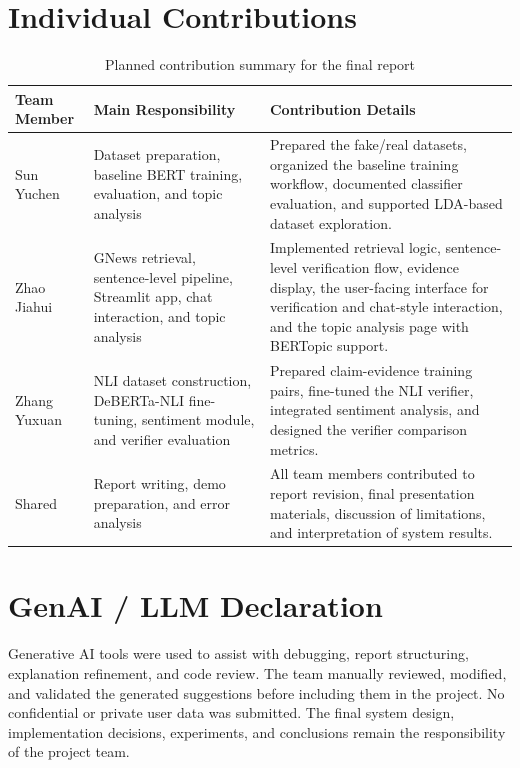 \documentclass[11pt]{article}
\begin{document}
\section{Individual Contributions}

\begin{table}[htbp]
    \centering
    \caption{Planned contribution summary for the final report}
    \begin{tabularx}{\textwidth}{@{}p{}p{}Y@{}}
        \toprule
        \textbf{Team Member} & \textbf{Main Responsibility} & \textbf{Contribution Details} \\
        \midrule
        Sun Yuchen & Dataset preparation, baseline BERT training, evaluation, and topic analysis & Prepared the fake/real datasets, organized the baseline training workflow, documented classifier evaluation, and supported LDA-based dataset exploration. \\
        Zhao Jiahui & GNews retrieval, sentence-level pipeline, Streamlit app, chat interaction, and topic analysis & Implemented retrieval logic, sentence-level verification flow, evidence display, the user-facing interface for verification and chat-style interaction, and the topic analysis page with BERTopic support. \\
        Zhang Yuxuan & NLI dataset construction, DeBERTa-NLI fine-tuning, sentiment module, and verifier evaluation & Prepared claim-evidence training pairs, fine-tuned the NLI verifier, integrated sentiment analysis, and designed the verifier comparison metrics. \\
        Shared & Report writing, demo preparation, and error analysis & All team members contributed to report revision, final presentation materials, discussion of limitations, and interpretation of system results. \\
        \bottomrule
    \end{tabularx}
\end{table}

\section{GenAI / LLM Declaration}

Generative AI tools were used to assist with debugging, report structuring,
explanation refinement, and code review. The team manually reviewed, modified,
and validated the generated suggestions before including them in the project. No
confidential or private user data was submitted. The final system design,
implementation decisions, experiments, and conclusions remain the
responsibility of the project team.
\end{document}
